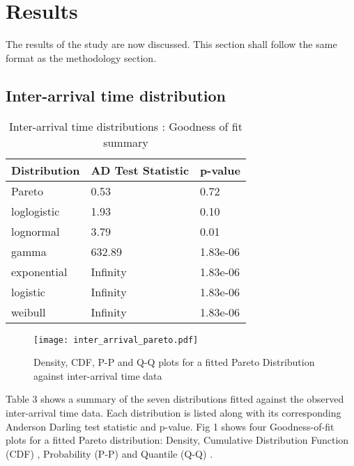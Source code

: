 \documentclass[5p]{elsarticle}
\begin{document}
\section{Results}
The results of the study are now discussed. This section shall follow the same format as the methodology section.

\subsection{Inter-arrival time distribution}

\begin {table}
\caption {Inter-arrival time distributions :  Goodness of fit summary} 
\begin{center}
\begin{tabular}{p{2.1cm} |  p{3.1cm} | p{1.3cm}} \hline \bf{Distribution} & \bf{AD Test Statistic} & \bf{p-value}
\\ \hline Pareto & 0.53 & 0.72 
\\ loglogistic & 1.93 & 0.10
\\ lognormal & 3.79 & 0.01
\\ gamma & 632.89 & 1.83e-06	
\\ exponential & Infinity  & 1.83e-06
\\ logistic & Infinity & 1.83e-06	
\\ weibull  & Infinity & 1.83e-06 
\\ \hline
\end{tabular}
\end{center}
\end{table}

\begin{figure*}[]
\begin{center}
\texttt{[image: inter\_arrival\_pareto.pdf]} 
\caption{Density, CDF, P-P and Q-Q plots for a fitted Pareto Distribution against inter-arrival time data}
\end{center}
\label{fig:outagedistribution}
\end{figure*}

Table 3 shows a summary of the seven distributions fitted against the observed inter-arrival time data. Each distribution is listed along with its corresponding Anderson Darling test statistic and p-value. Fig 1 shows four Goodness-of-fit plots for a fitted Pareto distribution: Density, Cumulative Distribution Function (CDF) , Probability (P-P) \cite{gibbons2011nonparametric}  and Quantile (Q-Q) \cite{wilk1968probability}.  
\end{document}
